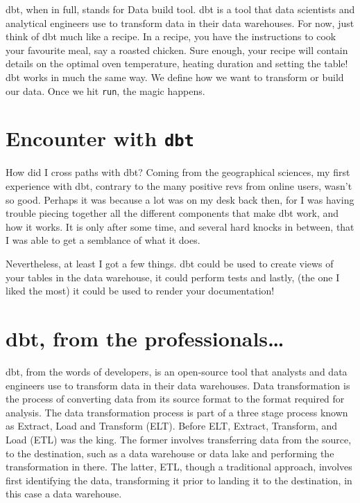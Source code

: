 \documentclass[
]{book}
\begin{document}
dbt, when in full, stands for Data build tool. dbt is a tool that data scientists and analytical engineers use to transform data in their data warehouses. For now, just think of dbt much like a recipe. In a recipe, you have the instructions to cook your favourite meal, say a roasted chicken. Sure enough, your recipe will contain details on the optimal oven temperature, heating duration and setting the table! dbt works in much the same way. We define how we want to transform or build our data. Once we hit \texttt{run}, the magic happens.

\hypertarget{encounter-with-dbt}{%
\section{\texorpdfstring{Encounter with \texttt{dbt}}{Encounter with dbt}}\label{encounter-with-dbt}}

How did I cross paths with dbt? Coming from the geographical sciences, my first experience with dbt, contrary to the many positive revs from online users, wasn't so good. Perhaps it was because a lot was on my desk back then, for I was having trouble piecing together all the different components that make dbt work, and how it works. It is only after some time, and several hard knocks in between, that I was able to get a semblance of what it does.

Nevertheless, at least I got a few things. dbt could be used to create views of your tables in the data warehouse, it could perform tests and lastly, (the one I liked the most) it could be used to render your documentation!

\hypertarget{dbt-from-the-professionals}{%
\section{dbt, from the professionals\ldots{}}\label{dbt-from-the-professionals}}

dbt, from the words of developers, is an open-source tool that analysts and data engineers use to transform data in their data warehouses. Data transformation is the process of converting data from its source format to the format required for analysis. The data transformation process is part of a three stage process known as Extract, Load and Transform (ELT). Before ELT, Extract, Transform, and Load (ETL) was the king. The former involves transferring data from the source, to the destination, such as a data warehouse or data lake and performing the transformation in there. The latter, ETL, though a traditional approach, involves first identifying the data, transforming it prior to landing it to the destination, in this case a data warehouse.
\end{document}
